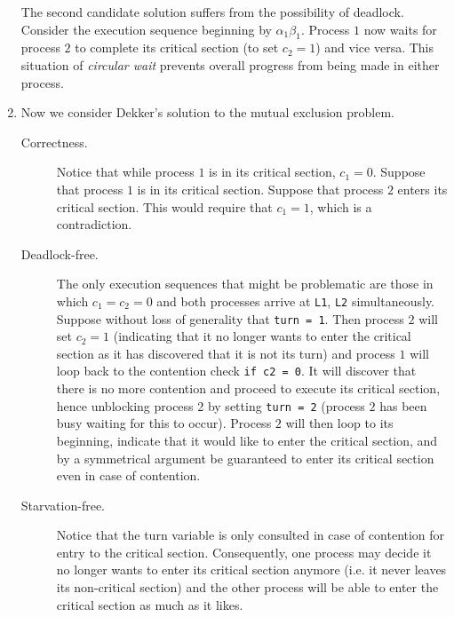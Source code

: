 \documentclass[11pt,letterpaper]{article}
\begin{document}
\begin{enumerate}
        The second candidate solution suffers from the possibility of deadlock.
        Consider the execution sequence beginning by $\alpha_1 \beta_1$.
        Process $1$ now waits for process $2$ to complete its critical section
        (to set $c_2 = 1$) and vice versa. This situation of \emph{circular
        wait} prevents overall progress from being made in either process.

    \item Now we consider Dekker's solution to the mutual exclusion problem.

        \begin{description}
            \item[Correctness.]
                Notice that while process $1$ is in its critical section,
                $c_1 = 0$. Suppose that process $1$ is in its critical section.
                Suppose that process $2$ enters its critical section. This
                would require that $c_1 = 1$, which is a contradiction.

            \item[Deadlock-free.]
                The only execution sequences that might be problematic are
                those in which $c_1 = c_2 = 0$ and both processes arrive at
                \texttt{L1}, \texttt{L2} simultaneously. Suppose without loss
                of generality that \texttt{turn = 1}. Then process $2$ will set
                $c_2 = 1$ (indicating that it no longer wants to enter the
                critical section as it has discovered that it is not its turn)
                and process $1$ will loop back to the contention check
                \texttt{if c2 = 0}. It will discover that there is no more
                contention and proceed to execute its critical section, hence
                unblocking process 2 by setting \texttt{turn = 2} (process $2$
                has been busy waiting for this to occur). Process $2$ will then
                loop to its beginning, indicate that it would like to enter the
                critical section, and by a symmetrical argument be guaranteed
                to enter its critical section even in case of contention.

            \item[Starvation-free.]
                Notice that the turn variable is only consulted in case of
                contention for entry to the critical section. Consequently, one
                process may decide it no longer wants to enter its critical
                section anymore (i.e. it never leaves its non-critical section)
                and the other process will be able to enter the critical
                section as much as it likes.


\end{description}
\end{enumerate}
\end{document}
